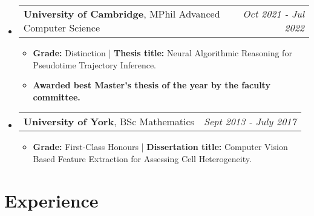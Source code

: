 \documentclass[letterpaper,11pt]{article}
\makeatletter
\newcommand{\CVItem}[1]{
  \item{
    {#1 \vspace{0pt}}
  }
}
\newcommand{\CVSubHeading}[4]{
  \vspace{2pt}\item
    \begin{tabular*}{0.97\textwidth}[t]{l@{\extracolsep{\fill}}r}
      \textbf{#1}, {#3} & \textit{#4} \\
    \end{tabular*}\vspace{-3pt}
}
\newcommand{\CVSubHeadingListStart}{\begin{itemize}[leftmargin=0.15in, label={}]}
\newcommand{\CVSubHeadingListEnd}{\end{itemize}}
\newcommand{\CVItemListStart}{\begin{itemize}}
\newcommand{\CVItemListEnd}{\end{itemize}\vspace{-3pt}}
\makeatother
\begin{document}
\CVSubHeadingListStart
    \CVSubHeading
      {University of Cambridge}{Cambridge, UK}
      {MPhil Advanced Computer Science}{Oct 2021 - Jul 2022}
      \CVItemListStart
        \CVItem{\textbf{Grade:} Distinction | \textbf{Thesis title:} Neural Algorithmic Reasoning for Pseudotime Trajectory Inference.} 
        \CVItem{\textbf{Awarded best Master's thesis of the year by the faculty committee.}}
      \CVItemListEnd
      \vspace{-0.5em}
    \CVSubHeading
      {University of York}{York, UK}
      {BSc Mathematics}{Sept 2013 - July 2017}
      \CVItemListStart
        \CVItem{\textbf{Grade:} First-Class Honours | \textbf{Dissertation title:} Computer Vision Based Feature Extraction for Assessing Cell Heterogeneity.}
      \CVItemListEnd
\CVSubHeadingListEnd

\section{Experience}
\end{document}
